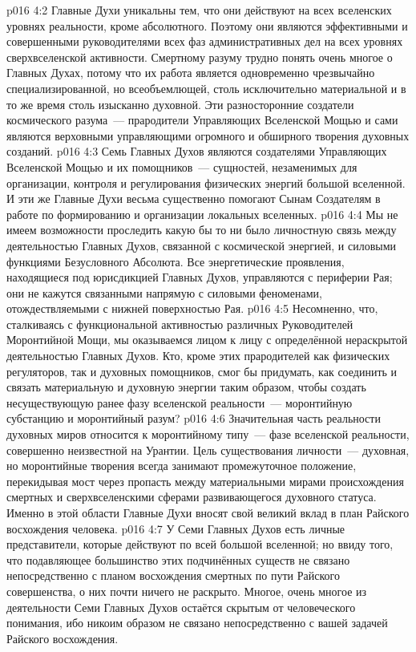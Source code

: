 \vs p016 4:2 Главные Духи уникальны тем, что они действуют на всех вселенских уровнях реальности, кроме абсолютного. Поэтому они являются эффективными и совершенными руководителями всех фаз административных дел на всех уровнях сверхвселенской активности. Смертному разуму трудно понять очень многое о Главных Духах, потому что их работа является одновременно чрезвычайно специализированной, но всеобъемлющей, столь исключительно материальной и в то же время столь изысканно духовной. Эти разносторонние создатели космического разума~--- прародители Управляющих Вселенской Мощью и сами являются верховными управляющими огромного и обширного творения духовных созданий.
\vs p016 4:3 Семь Главных Духов являются создателями Управляющих Вселенской Мощью и их помощников~--- сущностей, незаменимых для организации, контроля и регулирования физических энергий большой вселенной. И эти же Главные Духи весьма существенно помогают Сынам Создателям в работе по формированию и организации локальных вселенных.
\vs p016 4:4 Мы не имеем возможности проследить какую бы то ни было личностную связь между деятельностью Главных Духов, связанной с космической энергией, и силовыми функциями Безусловного Абсолюта. Все энергетические проявления, находящиеся под юрисдикцией Главных Духов, управляются с периферии Рая; они не кажутся связанными напрямую с силовыми феноменами, отождествляемыми с нижней поверхностью Рая.
\vs p016 4:5 Несомненно, что, сталкиваясь с функциональной активностью различных Руководителей Моронтийной Мощи, мы оказываемся лицом к лицу с определённой нераскрытой деятельностью Главных Духов. Кто, кроме этих прародителей как физических регуляторов, так и духовных помощников, смог бы придумать, как соединить и связать материальную и духовную энергии таким образом, чтобы создать несуществующую ранее фазу вселенской реальности~--- моронтийную субстанцию и моронтийный разум?
\vs p016 4:6 Значительная часть реальности духовных миров относится к моронтийному типу~--- фазе вселенской реальности, совершенно неизвестной на Урантии. Цель существования личности~--- духовная, но моронтийные творения всегда занимают промежуточное положение, перекидывая мост через пропасть между материальными мирами происхождения смертных и сверхвселенскими сферами развивающегося духовного статуса. Именно в этой области Главные Духи вносят свой великий вклад в план Райского восхождения человека.
\vs p016 4:7 У Семи Главных Духов есть личные представители, которые действуют по всей большой вселенной; но ввиду того, что подавляющее большинство этих подчинённых существ не связано непосредственно с планом восхождения смертных по пути Райского совершенства, о них почти ничего не раскрыто. Многое, очень многое из деятельности Семи Главных Духов остаётся скрытым от человеческого понимания, ибо никоим образом не связано непосредственно с вашей задачей Райского восхождения.
